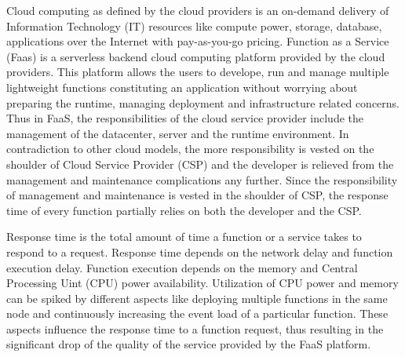 
Cloud computing as defined by the cloud providers is an on-demand delivery of Information Technology (IT) resources like compute power, storage, database, applications over the Internet with pay-as-you-go pricing. 
Function as a Service (Faas) is a serverless backend cloud computing platform provided by the cloud providers. 
This platform allows the users to develope, run and manage multiple lightweight functions constituting an application without worrying about preparing the runtime, managing deployment and infrastructure related concerns.
Thus in FaaS, the responsibilities of the cloud service provider include the management of the datacenter, server and the runtime environment.
In contradiction to other cloud models, the more responsibility is vested on the shoulder of Cloud Service Provider (CSP) and the developer is relieved from the management and maintenance complications any further.
Since the responsibility of management and maintenance is vested in the shoulder of CSP, the response time of every function partially relies on both the developer and the CSP.

Response time is the total amount of time a function or a service takes to respond to a request. 
Response time depends on the network delay and function execution delay.
Function execution depends on the memory and Central Processing Uint (CPU) power availability.
Utilization of CPU power and memory can be spiked by different aspects like deploying multiple functions in the same node and continuously increasing the event load of a particular function.
These aspects influence the response time to a function request, thus resulting in the significant drop of the quality of the service provided by the FaaS platform.


